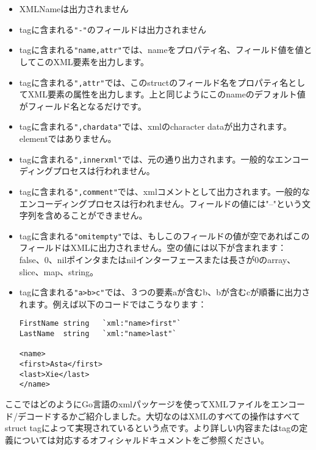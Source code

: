 \begin{itemize}
  \item XMLNameは出力されません
  \item tagに含まれる\texttt{"-"}のフィールドは出力されません
  \item tagに含まれる\texttt{"name,attr"}では、nameをプロパティ名、フィールド値を値としてこのXML要素を出力します。
  \item tagに含まれる\texttt{",attr"}では、このstructのフィールド名をプロパティ名としてXML要素の属性を出力します。上と同じようにこのnameのデフォルト値がフィールド名となるだけです。
  \item tagに含まれる\texttt{",chardata"}では、xmlのcharacter dataが出力されます。elementではありません。
  \item tagに含まれる\texttt{",innerxml"}では、元の通り出力されます。一般的なエンコーディングプロセスは行われません。
  \item tagに含まれる\texttt{",comment"}では、xmlコメントとして出力されます。一般的なエンコーディングプロセスは行われません。フィールドの値には"--"という文字列を含めることができません。
  \item tagに含まれる\texttt{"omitempty"}では、もしこのフィールドの値が空であればこのフィールドはXMLに出力されません。空の値には以下が含まれます： false、0、nilポインタまたはnilインターフェースまたは長さが0のarray、slice、map、string。
  \item tagに含まれる\texttt{"a>b>c"}では、３つの要素aが含むb、bが含むcが順番に出力されます。例えば以下のコードではこうなります：
    \begin{lstlisting}[numbers=none]
FirstName string   `xml:"name>first"`
LastName  string   `xml:"name>last"`

<name>
<first>Asta</first>
<last>Xie</last>
</name>
    \end{lstlisting}
\end{itemize}

ここではどのようにGo言語のxmlパッケージを使ってXMLファイルをエンコード/デコードするかご紹介しました。大切なのはXMLのすべての操作はすべてstruct tagによって実現されているという点です。より詳しい内容またはtagの定義については対応するオフィシャルドキュメントをご参照ください。


